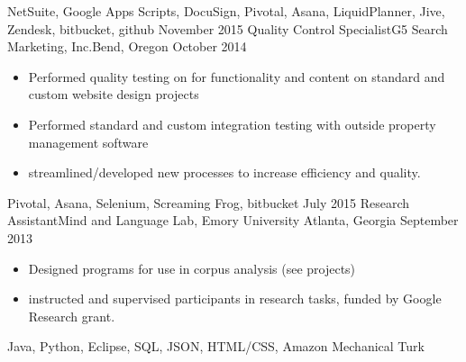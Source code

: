 \begin{experiences}
{\begin{itemize}
                      \end{itemize}
                    }
                    {NetSuite, Google Apps Scripts, DocuSign, Pivotal, Asana, LiquidPlanner, Jive, Zendesk, bitbucket, github}
  \emptySeparator
  \experiencetech
    {November 2015}     {Quality Control Specialist}{G5 Search Marketing, Inc.}{Bend, Oregon}
    {October 2014}    {
                      \begin{itemize}
                        \item Performed quality testing on for functionality and content on standard and custom website design projects 
                        \item Performed standard and custom integration testing with outside property management software
                        \item streamlined/developed new processes to increase efficiency and quality.
                      \end{itemize}
                    }
                    {Pivotal, Asana, Selenium, Screaming Frog, bitbucket}
  \emptySeparator
    \experiencetech
    {July 2015} {Research Assistant}{Mind and Language Lab, Emory University }{Atlanta, Georgia}
    {September 2013}    {
                      \begin{itemize}
                        \item Designed programs for use in corpus analysis (see projects)
                        \item instructed and supervised participants in research tasks, funded by Google Research grant.                
                      \end{itemize}
                    }
                    {Java, Python, Eclipse, SQL, JSON, HTML/CSS, Amazon Mechanical Turk}
  \emptySeparator

\end{experiences}
